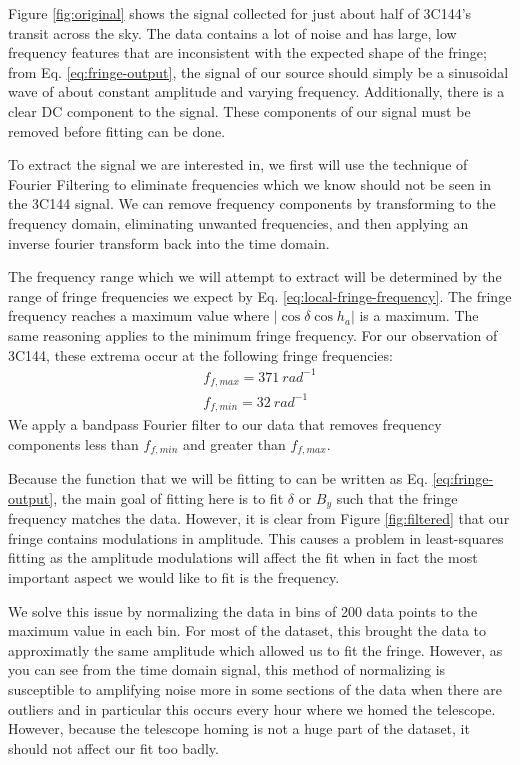 \documentclass[12pt]{article}
\begin{document}
Figure \ref{fig:original} shows the signal collected for just about half of 3C144's transit across the sky. The data contains a lot of noise and has large, low frequency features that are inconsistent with the expected shape of the fringe; from Eq. \ref{eq:fringe-output}, the signal of our source should simply be a sinusoidal wave of about constant amplitude and varying frequency. Additionally, there is a clear DC component to the signal. These components of our signal must be removed before fitting can be done.

To extract the signal we are interested in, we first will use the technique of Fourier Filtering to eliminate frequencies which we know should not be seen in the 3C144 signal. We can remove frequency components by transforming to the frequency domain, eliminating unwanted frequencies, and then applying an inverse fourier transform back into the time domain.

The frequency range which we will attempt to extract will be determined by the range of fringe frequencies we expect by Eq. \ref{eq:local-fringe-frequency}. The fringe frequency reaches a maximum value where $|\cos{\delta} \cos{h_a}|$ is a maximum. The same reasoning applies to the minimum fringe frequency. For our observation of 3C144, these extrema occur at the following fringe frequencies:
\begin{eqnarray}
f_{f, max} = 371\ rad^{-1}\\
f_{f, min} = 32\ rad^{-1}
\end{eqnarray}
We apply a bandpass Fourier filter to our data that removes frequency components less than $f_{f, min}$ and greater than $f_{f, max}$.

Because the function that we will be fitting to can be written as Eq. \ref{eq:fringe-output}, the main goal of fitting here is to fit $\delta$ or $B_y$ such that the fringe frequency matches the data. However, it is clear from Figure \ref{fig:filtered} that our fringe contains modulations in amplitude. This causes a problem in least-squares fitting as the amplitude modulations will affect the fit when in fact the most important aspect we would like to fit is the frequency.

We solve this issue by normalizing the data in bins of 200 data points to the maximum value in each bin. For most of the dataset, this brought the data to approximatly the same amplitude which allowed us to fit the fringe. However, as you can see from the time domain signal, this method of normalizing is susceptible to amplifying noise more in some sections of the data when there are outliers and in particular this occurs every hour where we homed the telescope. However, because the telescope homing is not a huge part of the dataset, it should not affect our fit too badly.
\end{document}
